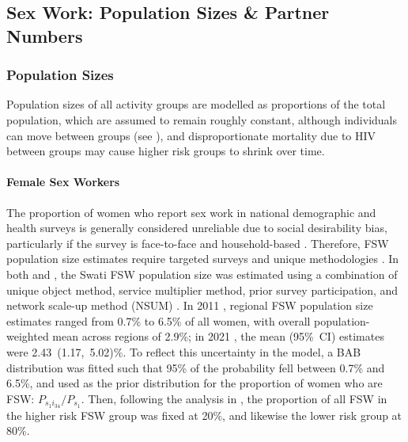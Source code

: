 \subsection{Sex Work: Population Sizes \& Partner Numbers}\label{model.par.sw}
\subsubsection{Population Sizes}\label{model.par.sw.size}
Population sizes of all activity groups are modelled as proportions of the total population,
which are assumed to remain roughly constant,
although individuals can move between groups (see ),
and disproportionate mortality due to HIV between groups
may cause higher risk groups to shrink over time.
\paragraph{Female Sex Workers}
The proportion of women who report sex work in national demographic and health surveys
is generally considered unreliable due to social desirability bias,
particularly if the survey is face-to-face and household-based
\cite{Konings1995,Gregson2002,Gregson2004,Lowndes2012,Behanzin2013}.
Therefore, FSW population size estimates require
targeted surveys and unique methodologies \cite{UNAIDS2010kps,Abdul-Quader2014}.
In both \cite{EswKP2014} and \cite{EswIBBS2022}, the Swati FSW population size
was estimated using a combination of
unique object method, service multiplier method, prior survey participation,
and network scale-up method (NSUM) \cite{UNAIDS2010kps}.
In 2011 \cite{EswKP2014}, regional FSW population size estimates
ranged from 0.7\% to 6.5\% of all women,
with overall population-weighted mean across regions of 2.9\%;
in 2021 \cite{EswIBBS2022}, the mean (95\%~CI) estimates were 2.43~(1.17,~5.02)\%.
To reflect this uncertainty in the model, a BAB distribution was fitted
such that 95\% of the probability fell between 0.7\% and 6.5\%,
and used as the prior distribution for the proportion of women who are FSW:
$P_{s_{1}i_{34}} / P_{s_{1}}$.
Then, following the analysis in ,
the proportion of all FSW in the higher risk FSW group was fixed at 20\%,
and likewise the lower risk group at 80\%.
